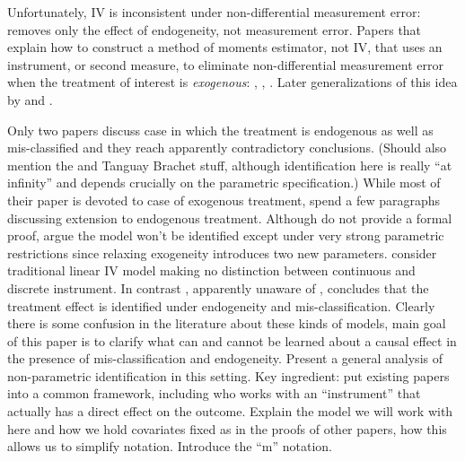 Unfortunately, IV is inconsistent under non-differential measurement error: removes only the effect of endogeneity, not measurement error.
Papers that explain how to construct a method of moments estimator, not IV, that uses an instrument, or second measure, to eliminate non-differential measurement error when the treatment of interest is \emph{exogenous}: \cite{KRS}, \cite{BBS}, \cite{FL}.
Later generalizations of this idea by \cite{Lewbel} and \cite{Mahajan}.

Only two papers discuss case in which the treatment is endogenous as well as mis-classified and they reach apparently contradictory conclusions.
(Should also mention the \cite{Hausman} and Tanguay Brachet stuff, although identification here is really ``at infinity'' and depends crucially on the parametric specification.)
While most of their paper is devoted to case of exogenous treatment, \cite{FL} spend a few paragraphs discussing extension to endogenous treatment.
Although do not provide a formal proof, argue the model won't be identified except under very strong parametric restrictions since relaxing exogeneity introduces two new parameters.
\cite{FL} consider traditional linear IV model making no distinction between continuous and discrete instrument.
In contrast \cite{Mahajan}, apparently unaware of \cite{FL},  concludes that the treatment effect is identified under endogeneity and mis-classification.
Clearly there is some confusion in the literature about these kinds of models, main goal of this paper is to clarify what can and cannot be learned about a causal effect in the presence of mis-classification and endogeneity. 
Present a general analysis of non-parametric identification in this setting.
Key ingredient: put existing papers into a common framework, including \cite{Lewbel} who works with an ``instrument'' that actually has a direct effect on the outcome.
Explain the model we will work with here and how we hold covariates fixed as in the proofs of other papers, how this allows us to simplify notation.
Introduce the ``m'' notation.




